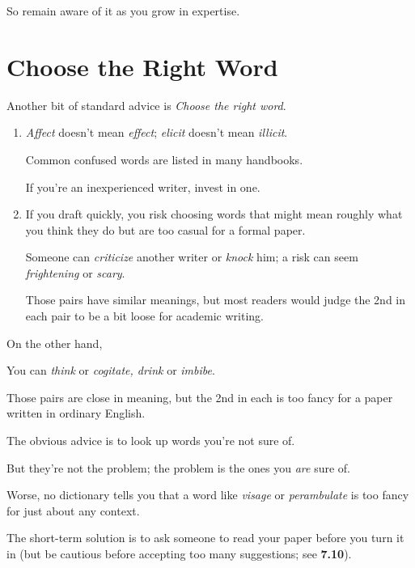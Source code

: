 \documentclass[oneside]{book}
\numberwithin{equation}{section}
\begin{document}
So remain aware of it as you grow in expertise.

\section{Choose the Right Word}
Another bit of standard advice is \textit{Choose the right word}.
\begin{enumerate}
    \item {}
    
    \textit{Affect} doesn't mean \textit{effect}; \textit{elicit} doesn't mean \textit{illicit}.
    
    Common confused words are listed in many handbooks.
    
    If you're an inexperienced writer, invest in one.
    \item {}
    
    If you draft quickly, you risk choosing words that might mean roughly what you think they do but are too casual for a formal paper.
    
    Someone can \textit{criticize} another writer or \textit{knock} him; a risk can seem \textit{frightening} or \textit{scary}.
    
    Those pairs have similar meanings, but most readers would judge the 2nd in each pair to be a bit loose for academic writing.
\end{enumerate}
On the other hand, 

You can \textit{think} or \textit{cogitate, drink} or \textit{imbibe}.

Those pairs are close in meaning, but the 2nd in each is too fancy for a paper written in ordinary English.


%
The obvious advice is to look up words you're not sure of.

But they're not the problem; the problem is the ones you \textit{are} sure of.

Worse, no dictionary tells you that a word like \textit{visage} or \textit{perambulate} is too fancy for just about any context.

The short-term solution is to ask someone to read your paper before you turn it in (but be cautious before accepting too many suggestions; see \textbf{7.10}).
\end{document}

